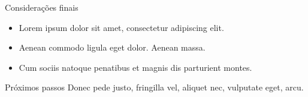 \begin{frame}{Considerações finais}
  \begin{itemize}
    \item Lorem ipsum dolor sit amet, consectetur adipiscing elit.
    \item Aenean commodo ligula eget dolor. Aenean massa.
    \item Cum sociis natoque penatibus et magnis dis parturient montes.
  \end{itemize}

  \begin{alertblock}{Próximos passos}
    Donec pede justo, fringilla vel, aliquet nec, vulputate eget, arcu.
  \end{alertblock}
\end{frame}